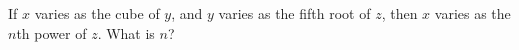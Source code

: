 If $x$ varies as the cube of $y$, and $y$ varies as the fifth root of $z$, then $x$ varies as the $n$th power of $z$. What is $n$?
